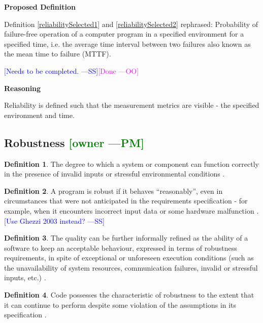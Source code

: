\documentclass[letterpaper, cleveref]{lipics-v2019}
\newcommand{\authornote}[3]{\textcolor{#1}{[#3 ---#2]}}
\newcommand{\authornote}[3]{}
\newcommand{\wss}[1]{\authornote{blue}{SS}{#1}} %
\newcommand{\oo}[1]{\authornote{magenta}{OO}{#1}} %
\newcommand{\pmi}[1]{\authornote{green}{PM}{#1}} %
\theoremstyle{definition}
\newtheorem{defn}{Definition}
\begin{document}
\noindent \textbf{Proposed Definition}

Definition \ref{reliabilitySelected1} and \ref{reliabilitySelected2} rephrased:
Probability of failure-free operation of a computer program in a specified
environment for a specified time, i.e. the average time interval between two
failures also known as the mean time to failure (MTTF).

\wss{Needs to be completed.}\oo{Done}

\noindent \textbf{Reasoning}

Reliability is defined such that the measurement metrics are visible - the
specified environment and time. 


\subsection{Robustness \pmi{owner}}

\begin{defn}
	The degree to which a system or component can function correctly in the
	presence of invalid inputs or stressful environmental conditions
	\citep{IEEEStdGlossarySET1990}.
\end{defn}

\begin{defn} \label{RobustnessDefnSelected}
	A program is robust if it behaves ``reasonably'', even in circumstances that
	were not anticipated in the requirements specification - for example, when it
	encounters incorrect input data or some hardware malfunction
	\citep{ghezzi1991fundamentals}. \wss{Use Ghezzi 2003 instead?}
\end{defn}

\begin{defn}
	The quality can be further informally refined as the ability of a software
  to keep an acceptable behaviour, expressed in terms of robustness
  requirements, in spite of exceptional or unforeseen execution conditions
  (such as the unavailability of system resources, communication failures,
  invalid or stressful inputs, etc.) \citep{fernandez2005model}.
\end{defn}

\begin{defn} \label{RobustnessPartialDefn}
	Code possesses the characteristic of robustness to the extent that it can
	continue to perform despite some violation of the assumptions in its
	specification \citep{boehm2007software}.
\end{defn}
\end{document}
